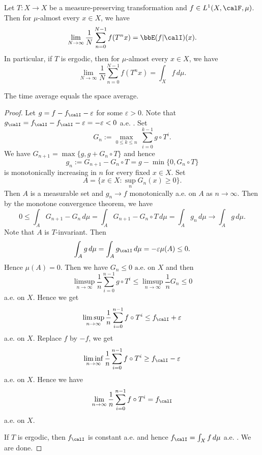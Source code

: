   \begin{theorem}
    Let $T: X \to X$ be a measure-preserving transformation and $f \in L^1(X, \calF, \mu)$. 
    Then for $\mu$-almost every $x \in X$, we have 
    \[ \lim_{N \to \infty} \frac{1}{N} \sum_{n=0}^{N-1} f(T^n x) = \bbE(f | \calI)(x). \]
    In particular, if $T$ is ergodic, then for $\mu$-almost every $x \in X$, we have
    \[ \lim_{N \to \infty} \frac{1}{N} \sum_{n=0}^{N-1} f(T^n x) = \int_X f \, d\mu. \]
  \end{theorem}
  \begin{slogan}
    The time average equals the space average.
  \end{slogan}
  \begin{proof}
    Let $g = f - f_\calI - \varepsilon$ for some $\varepsilon > 0$.
    Note that $g_\calI = f_\calI - f_\calI - \varepsilon = -\varepsilon < 0$ a.e. .
    Set 
    \[ G_n := \max_{0 \leq k \leq n} \ \sum_{i=0}^{k-1} g \circ T^i. \]
    We have $G_{n+1} = \max\{g, g + G_n \circ T\}$ and hence
    \[ g_n := G_{n+1} - G_n \circ T = g - \min\{0, G_n \circ T\} \]
    is monotonically increasing in $n$ for every fixed $x \in X$.
    Set 
    \[ A = \{x \in X : \sup_n G_n(x) \geq 0\}. \]
    Then $A$ is a measurable set and $g_n \to f$ monotonically a.e. on $A$ as $n \to \infty$.
    Then by the monotone convergence theorem, we have
    \[ 0 \leq \int_A G_{n+1} - G_n \, d\mu = \int_A G_{n+1} - G_n \circ T \, d\mu = \int_A g_n \, d\mu \to \int_A g \, d\mu. \]
    Note that $A$ is $T$-invariant.
    Then 
    \[ \int_A g \, d\mu = \int_A g_\calI \, d\mu = -\varepsilon \mu(A) \leq 0. \]
    Hence $\mu(A) = 0$.
    Then we have $G_n \leq 0 \text{ a.e. on } X$ and then 
    \[ \limsup_{n \to \infty} \frac{1}{n} \sum_{i=0}^{n-1} g \circ T^i \leq \limsup_{n \to \infty} \frac{1}{n} G_n \leq 0 \]
    a.e. on $X$.
    Hence we get 
    \[ \limsup_{n \to \infty} \frac{1}{n} \sum_{i=0}^{n-1} f \circ T^i \leq f_\calI + \varepsilon \]
    a.e. on $X$.
    Replace $f$ by $-f$, we get
    \[ \liminf_{n \to \infty} \frac{1}{n} \sum_{i=0}^{n-1} f \circ T^i \geq f_\calI - \varepsilon \]
    a.e. on $X$.
    Hence we have
    \[ \lim_{n \to \infty} \frac{1}{n} \sum_{i=0}^{n-1} f \circ T^i = f_\calI \]
    a.e. on $X$.

    If $T$ is ergodic, then $f_\calI$ is constant a.e. and hence $f_\calI = \int_X f \, d\mu$ a.e. .
    We are done.
  \end{proof}

